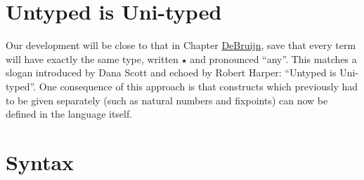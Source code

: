 \begin{fence}
\begin{code}
\\
\>[0]\AgdaSpace{}%
\AgdaSpace{}%
\AgdaSpace{}%
\AgdaSpace{}%
\AgdaSymbol{(}\AgdaSymbol{;}\AgdaSpace{}%
\AgdaSymbol{)}\<%
\\
\>[0]\AgdaSpace{}%
\AgdaSpace{}%
\AgdaSpace{}%
\AgdaSpace{}%
\AgdaSymbol{(}\AgdaSymbol{;}\AgdaSpace{}%
\AgdaSymbol{;}\AgdaSpace{}%
\AgdaSymbol{;}\AgdaSpace{}%
\AgdaSymbol{)}\<%
\\
\>[0]\AgdaSpace{}%
\AgdaSpace{}%
\AgdaSpace{}%
\AgdaSpace{}%
\AgdaSymbol{(}\AgdaSymbol{)}\<%
\\
\>[0]\AgdaSpace{}%
\AgdaSpace{}%
\AgdaSpace{}%
\AgdaSpace{}%
\AgdaSymbol{(}\AgdaSymbol{)}\<%
\\
\>[0]\AgdaSpace{}%
\AgdaSpace{}%
\AgdaSpace{}%
\AgdaSpace{}%
\AgdaSymbol{(}\AgdaSymbol{)}\<%
\end{code}
\end{fence}

\hypertarget{untyped-is-uni-typed}{%
\section{Untyped is Uni-typed}\label{untyped-is-uni-typed}}

Our development will be close to that in Chapter
\protect\hyperlink{DeBruijn}{DeBruijn}, save that every term will have
exactly the same type, written \texttt{★} and pronounced ``any''. This
matches a slogan introduced by Dana Scott and echoed by Robert Harper:
``Untyped is Uni-typed''. One consequence of this approach is that
constructs which previously had to be given separately (such as natural
numbers and fixpoints) can now be defined in the language itself.

\hypertarget{syntax}{%
\section{Syntax}\label{syntax}}

